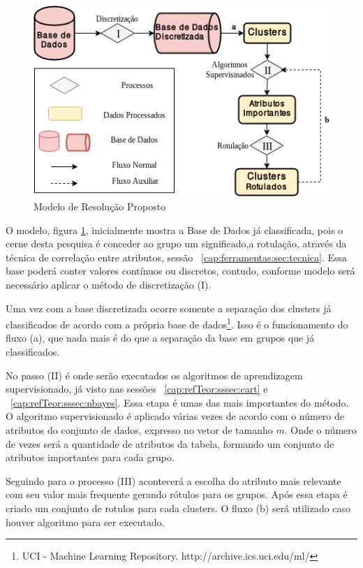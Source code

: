 \begin{figure}[h!]
        \centering
        \includegraphics[scale=0.7]{figs/modeloResolucao.png}
        \caption{Modelo de Resolução Proposto} \label{fig:modeloresolucao}
\end{figure}

O modelo, figura \ref{fig:modeloresolucao}, inicialmente mostra a Base de Dados  já classificada, pois o cerne desta pesquisa é conceder ao grupo um significado,a rotulação,  através da técnica de correlação entre atributos, sessão ~\ref{cap:ferramentas:sec:tecnica}. Essa base poderá conter  valores contínuos ou discretos, contudo, conforme modelo será necessário aplicar o método de discretização (I).

Uma vez com a base discretizada ocorre somente a separação dos clusters já classificados de acordo com a própria base de dados\footnote{UCI - Machine Learning Repository. http://archive.ics.uci.edu/ml/ }. Isso é o funcionamento do fluxo (a), que nada mais é do que a separação da base em grupos que já classificados.

No passo (II) é onde serão executados os algoritmos de aprendizagem supervisionado, já visto nas sessões ~\ref{cap:refTeor:sssec:cart} e ~\ref{cap:refTeor:sssec:nbayes}. Essa etapa é umas das mais importantes do método. O algoritmo supervisionado é aplicado várias vezes de acordo com o número de atributos do conjunto de dados, expresso no vetor de tamanho ${m}$. Onde o número de vezes será a quantidade de atributos da tabela, formando um conjunto de atributos importantes para cada grupo.

Seguindo para o processo (III) acontecerá a escolha do atributo mais relevante com seu valor mais frequente gerando rótulos para os grupos. Após essa etapa é criado um conjunto de rotulos para cada clusters. O fluxo (b) será utilizado caso houver algoritmo para ser executado.

